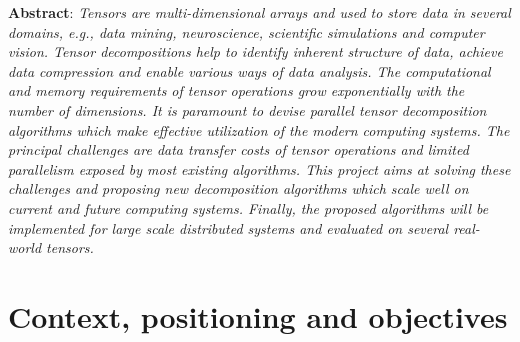 \documentclass[a4paper,11pt]{article}
\begin{document}
	\tableofcontents
	\newpage
	
	\textbf{Abstract}: \emph{Tensors are multi-dimensional arrays and used to store data in several domains, e.g., data mining, neuroscience, scientific simulations and computer vision. Tensor decompositions help to identify inherent structure of data, achieve data compression and enable various ways of data analysis. The computational and memory requirements of tensor operations grow exponentially with the number of dimensions. It is paramount to devise parallel tensor decomposition algorithms which make effective utilization of the modern computing systems. The principal challenges are data transfer costs of tensor operations and limited parallelism exposed by most existing algorithms. This project aims at solving these challenges and proposing new decomposition algorithms which scale well on current and future computing systems. Finally, the proposed algorithms will be implemented for large scale distributed systems and evaluated on several real-world tensors.}
	
	
	\section{Context, positioning and objectives}
	\label{sec:context}
	
\end{document}
